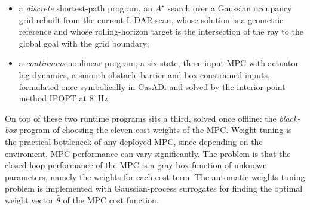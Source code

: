 \documentclass[11pt,a4paper]{article}
\newcommand{\astar}{$A^\star$}
\begin{document}
\begin{itemize}
  \item a \emph{discrete} shortest-path program, an \astar{} search over a Gaussian occupancy grid rebuilt
        from the current LiDAR scan, whose solution is a geometric reference and whose rolling-horizon target
        is the intersection of the ray to the global goal with the grid boundary;
  \item a \emph{continuous} nonlinear program, a six-state, three-input MPC with actuator-lag dynamics, a
        smooth obstacle barrier and box-constrained inputs, formulated once symbolically in CasADi
        \cite{andersson2019casadi} and solved by the interior-point method IPOPT
        \cite{wachter2006ipopt} at $8$~Hz.
\end{itemize}

On top of these two runtime programs sits a third, solved once offline: the \emph{black-box} program of
choosing the eleven cost weights of the MPC. Weight tuning is the practical bottleneck of any deployed MPC, since depending on the enviroment, MPC performance can vary significantly. The problem is that the closed-loop performance of the MPC is a gray-box function of unknown parameters, namely the weights for each cost term. The automatic weights tuning problem is
implemented with Gaussian-process surrogates \cite{rasmussen2006gp,shahriari2016bo} for finding the optimal weight vector $\hat\theta$ of the MPC cost function. 
\end{document}
